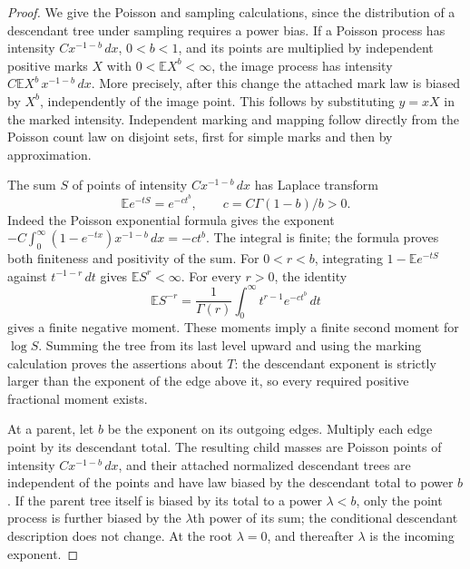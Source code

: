 \begin{proof}
We give the Poisson and sampling calculations, since the distribution of a
descendant tree under sampling requires a power bias.  If a Poisson process
has intensity $C x^{-1-b}\,dx$, $0<b<1$, and its points are multiplied by
independent positive marks $X$ with $0<\mathbb E X^b<\infty$, the image
process has intensity $C\mathbb E X^b\,x^{-1-b}\,dx$.  More precisely,
after this change the attached mark law is biased by $X^b$, independently
of the image point.  This follows by substituting $y=xX$ in the marked
intensity.  Independent marking and mapping follow directly from the
Poisson count law on disjoint sets, first for simple marks and then by
approximation.

The sum $S$ of points of intensity $C x^{-1-b}\,dx$ has Laplace transform
\begin{equation}
 \mathbb E e^{-tS}=e^{-ct^b},
 \qquad c=C\Gamma(1-b)/b>0.
 \label{arr:stable-laplace}
\end{equation}
Indeed the Poisson exponential formula gives the exponent
$-C\int_0^\infty(1-e^{-tx})x^{-1-b}\,dx=-ct^b$.
The integral is finite; the formula proves both finiteness and positivity
of the sum.  For $0<r<b$, integrating
$1-\mathbb E e^{-tS}$ against $t^{-1-r}\,dt$ gives
$\mathbb E S^r<\infty$.  For every $r>0$, the identity
\[
 \mathbb E S^{-r}
 =\frac1{\Gamma(r)}\int_0^\infty t^{r-1}e^{-ct^b}\,dt
\]
gives a finite negative moment.  These moments imply a finite second
moment for $\log S$.  Summing the tree from its last level upward and
using the marking calculation proves the assertions about $T$: the
descendant exponent is strictly larger than the exponent of the edge
above it, so every required positive fractional moment exists.

At a parent, let $b$ be the exponent on its outgoing edges.  Multiply
each edge point by its descendant total.  The resulting child masses are
Poisson points of intensity $C x^{-1-b}\,dx$, and their attached normalized
descendant trees are independent of the points and have law biased by the
descendant total to power $b$.  If the parent tree itself is biased by its
total to a power $\lambda<b$, only the point process is further biased by
the $\lambda$th power of its sum; the conditional descendant description
does not change.  At the root $\lambda=0$, and thereafter $\lambda$ is
the incoming exponent.


\end{proof}
